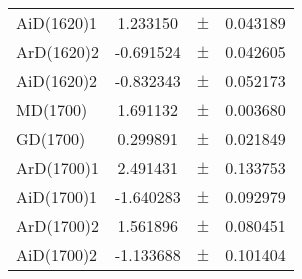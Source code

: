 \begin{table}
\begin{tiny}
\begin{tabular}{lccc}
AiD(1620)1 & 1.233150 & $\pm$ & 0.043189 \\
ArD(1620)2 & -0.691524 & $\pm$ & 0.042605 \\
AiD(1620)2 & -0.832343 & $\pm$ & 0.052173 \\
MD(1700) & 1.691132 & $\pm$ & 0.003680 \\
GD(1700) & 0.299891 & $\pm$ & 0.021849 \\
ArD(1700)1 & 2.491431 & $\pm$ & 0.133753 \\
AiD(1700)1 & -1.640283 & $\pm$ & 0.092979 \\
ArD(1700)2 & 1.561896 & $\pm$ & 0.080451 \\
AiD(1700)2 & -1.133688 & $\pm$ & 0.101404 \\
\bottomrule
\end{tabular}
\end{tiny}
\end{table}

\clearpage

